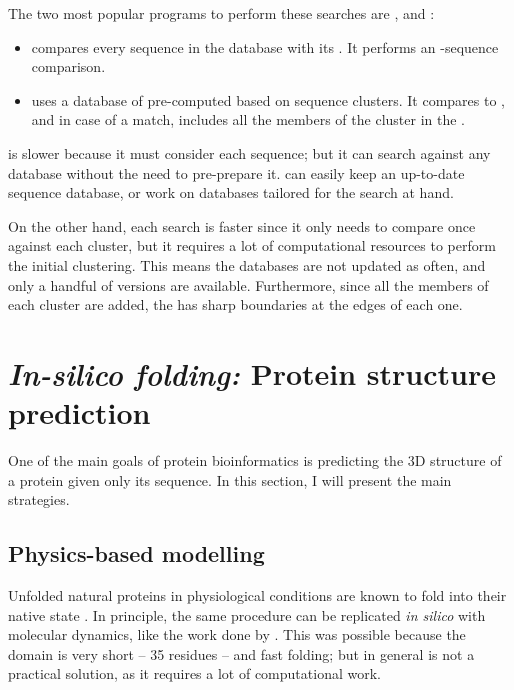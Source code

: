The two most popular programs to perform these searches are \JackHMMER \citep{jh}, and \HHBlits \citep{hhblits}:

\begin{itemize}
\item \JackHMMER{} compares every sequence in the database with its \HMM.
It performs an \HMM-sequence comparison.
\item \HHBlits{} uses a database of pre-computed \HMMs{} based on sequence clusters.
It compares \HMM{} to \HMM, and in case of a match, includes all the members of the cluster in the \MSA.
\end{itemize}

\JackHMMER is slower
because it must consider each sequence; but it can search against any database without the need to pre-prepare it.
\JackHMMER can easily keep an up-to-date sequence database, or work on databases tailored for the search at hand.

On the other hand, each \HHBlits{} search is faster since it only needs to compare once against each cluster, but it requires a lot of computational resources to perform the initial clustering.
This means the databases are not updated as often, and only a handful of versions are available.
Furthermore, since all the members of each cluster are added, the \MSA{} has sharp boundaries at the edges of each one.



\section[Protein structure prediction]{\emph{In-silico folding:} Protein structure prediction}
One of the main goals of protein bioinformatics is predicting the 3D structure of a protein given only its sequence.
In this section, I will present the main strategies.

\subsection{Physics-based modelling}
Unfolded natural proteins in physiological conditions are known to fold into their native state \citep{fold_graciously}.
In principle, the same procedure can be replicated \emph{in silico} with molecular dynamics, like the work done by \citet{physics_folding}.
This was possible because the domain is very short -- 35 residues -- and fast folding; but in general is not a practical solution, as it requires a lot of computational work.

